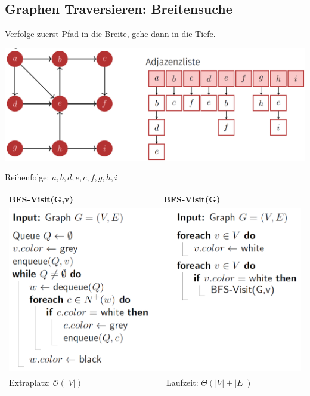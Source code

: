 \begin{sectionbox}
\subsection{Graphen Traversieren: Breitensuche}\smallskip
Verfolge zuerst Pfad in die Breite, gehe dann in die Tiefe.\par
\begin{center}
    \includegraphics[width = 0.9\columnwidth]{../img/DFS_sym.png}
\end{center}\par
Reihenfolge: $a, b, d, e, c, f, g, h, i$\medskip

\begin{tabular*}{\columnwidth}{@{\extracolsep\fill}ll@{}}
\textbf{BFS-Visit(G,v)} & $\quad \quad \quad \quad$\textbf{BFS-Visit(G)} \\
\multicolumn{2}{l}{\includegraphics[width = 0.9\columnwidth]{../img/BFS.png}} \\
Extraplatz: $\mathcal{O}(|V|)$&  $\quad \quad \quad \quad$ Laufzeit: $\Theta(|V|+|E|)$ \\
\end{tabular*}

\end{sectionbox}

